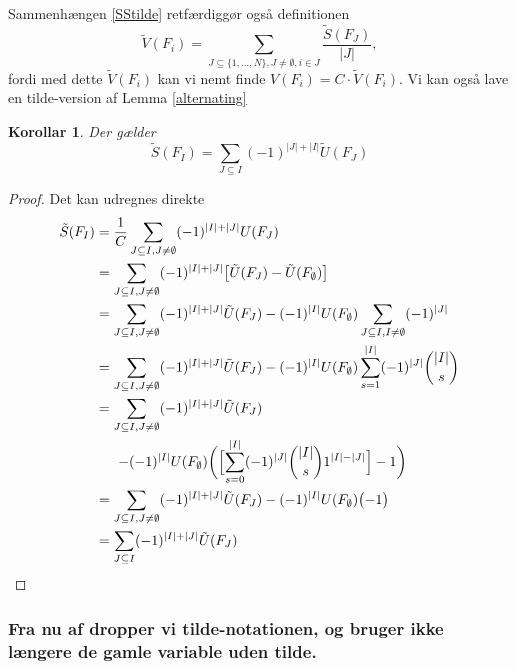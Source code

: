\documentclass[a4paper, 12pt]{article}
\newtheorem{korollar}{Korollar}
\begin{document}
Sammenhængen \eqref{SStilde} retfærdiggør også definitionen
\begin{equation}
\tilde V(F_i)=\sum_{J\subseteq\{1,\dots, N\}, J\neq \emptyset, i\in J} \frac{\tilde S(F_J)}{|J|},
\end{equation}
fordi med dette $\tilde V(F_i)$ kan vi nemt finde $V(F_i)=C\cdot \tilde V(F_i)$. Vi kan også lave en tilde-version af Lemma \ref{alternating}
\begin{korollar}\label{alternating_tilde}
Der gælder
\begin{equation}
\tilde S(F_I)=\sum_{J\subseteq I} (-1)^{|J|+|I|} \tilde U(F_J)
\end{equation}
\end{korollar}
\begin{proof}
Det kan udregnes direkte
\begin{align*}
\tilde S(F_I)&=\frac{1}{C}\sum_{J\subseteq I, J\neq \emptyset} (-1)^{|I|+|J|} U(F_J)\\
&=\sum_{J\subseteq I, J\neq \emptyset} (-1)^{|I|+|J|} \bigl[\tilde U(F_J)-\tilde U(F_{\emptyset})\bigr]\\
&=\sum_{J\subseteq I, J\neq \emptyset} (-1)^{|I|+|J|} \tilde U(F_J) -(-1)^{|I|}U(F_{\emptyset})\sum_{J\subseteq I, I\neq \emptyset} (-1)^{|J|}\\
&=\sum_{J\subseteq I, J\neq \emptyset} (-1)^{|I|+|J|} \tilde U(F_J) -(-1)^{|I|}U(F_{\emptyset})\sum_{s=1}^{|I|} (-1)^{|J|}{|I| \choose s}\\
&=\begin{lgathered}[t]\sum_{J\subseteq I, J\neq \emptyset} (-1)^{|I|+|J|} \tilde U(F_J)\\ \,\,-(-1)^{|I|}U(F_{\emptyset})\biggl(\Bigl[\sum_{s=0}^{|I|} (-1)^{|J|}{|I| \choose s}1^{|I|-|J|}\Bigr]-1\biggr)\end{lgathered}\\
&=\sum_{J\subseteq I, J\neq \emptyset} (-1)^{|I|+|J|} \tilde U(F_J) -(-1)^{|I|}U(F_{\emptyset})\bigl(-1\bigr)\\
&=\sum_{J\subseteq I} (-1)^{|I|+|J|} \tilde U(F_J)
\end{align*}
\end{proof}

\subsubsection*{
\textbf{Fra nu af dropper vi tilde-notationen, og bruger ikke længere de gamle variable uden tilde.}}
\end{document}
